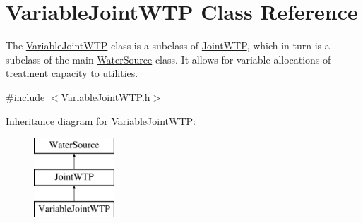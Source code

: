 \hypertarget{classVariableJointWTP}{}\section{Variable\+Joint\+W\+TP Class Reference}
\label{classVariableJointWTP}


The {\ttfamily \mbox{\hyperlink{classVariableJointWTP}{Variable\+Joint\+W\+TP}}} class is a subclass of \mbox{\hyperlink{classJointWTP}{Joint\+W\+TP}}, which in turn is a subclass of the main {\ttfamily \mbox{\hyperlink{classWaterSource}{Water\+Source}}} class. It allows for variable allocations of treatment capacity to utilities.  




{\ttfamily \#include $<$Variable\+Joint\+W\+T\+P.\+h$>$}

Inheritance diagram for Variable\+Joint\+W\+TP\+:\begin{figure}[H]
\begin{center}
\leavevmode
\includegraphics[height=3.000000cm]{classVariableJointWTP}
\end{center}
\end{figure}
